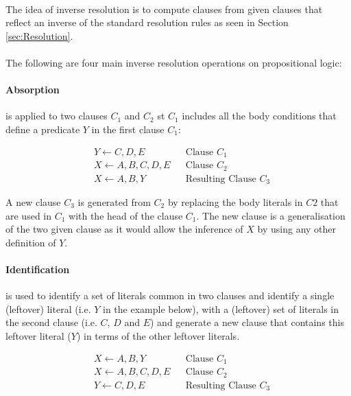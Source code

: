 \documentclass{article}
\theoremstyle{plain}
\theoremstyle{definition}
\begin{document}
\begin{multicols}{2}
\paragraph{} The idea of inverse resolution is to compute clauses from given clauses that reflect an inverse of the standard resolution rules as seen in Section \ref{sec:Resolution}. 

\paragraph{} The following are four main inverse resolution operations on propositional logic:

\paragraph{Absorption} is applied to two clauses $C_1$ and $C_2$ st $C_1$ includes all the body conditions that define a predicate $Y$ in the first clause $C_1$:

\begin{align*}
& Y \leftarrow C, D, E && \text{Clause } C_1\\
& X \leftarrow A, B, C, D, E && \text{Clause } C_2\\
& X \leftarrow A, B, Y && \text{Resulting Clause } C_3
\end{align*}

\noindent A new clause $C_3$ is generated from $C_2$ by replacing the body literals in $C2$ that are used in $C_1$ with the head of the clause $C_1$. The new clause is a generalisation of the two given clause as it would allow the inference of $X$ by using any other definition of $Y$.

\paragraph{Identification} is used to identify a set of literals common in two clauses and identify a single (leftover) literal (i.e. $Y$ in the example below), with a (leftover) set of literals in the second clause (i.e. $C$, $D$ and $E$) and generate a new clause that contains this leftover literal ($Y$) in terms of the other leftover literals.

\begin{align*}
& X \leftarrow A, B, Y && \text{Clause } C_1\\
& X \leftarrow A, B, C, D, E && \text{Clause } C_2\\
& Y \leftarrow C, D, E && \text{Resulting Clause } C_3
\end{align*}


\end{multicols}
\end{document}
